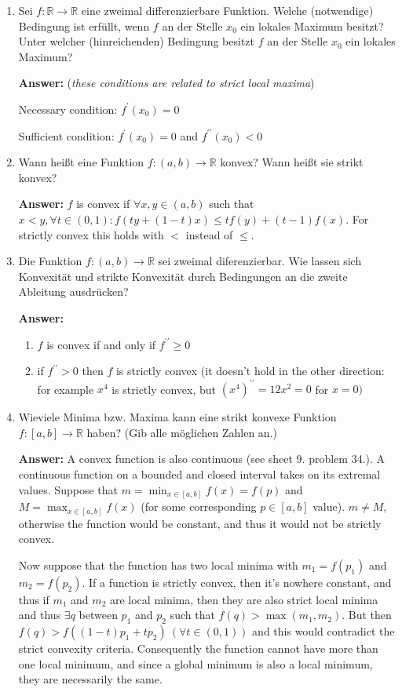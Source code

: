 \documentclass[11pt]{article}
\newcommand{\RR}[0]{\mathbb{R}}
\begin{document}
\begin{enumerate}
    \item Sei $f\colon \RR\to\RR$ eine zweimal differenzierbare Funktion. Welche (notwendige) Bedingung ist erfüllt, wenn $f$ an der Stelle $x_0$ ein lokales Maximum besitzt? Unter welcher (hinreichenden) Bedingung besitzt $f$ an der Stelle $x_0$ ein lokales Maximum?
    
    \textbf{Answer:} (\textit{these conditions are related to strict local maxima})

    Necessary condition: $f^\prime(x_0) = 0$

    Sufficient condition: $f^\prime(x_0) = 0$ and $f^{\prime\prime}(x_0) < 0$

    \item Wann heißt eine Funktion $f\colon (a, b)\to\RR$ konvex? Wann heißt sie strikt konvex?
    
    \textbf{Answer:} $f$ is convex if $\forall x, y \in (a, b)$ such that $x < y, \forall t \in (0, 1)\colon f(t y + (1-t) x) \le tf(y) + (t-1)f(x)$. For strictly convex this holds with $<$ instead of $\le$.
    \item Die Funktion $f\colon (a, b)\to\RR$ sei zweimal diferenzierbar. Wie lassen sich Konvexität
    und strikte Konvexität durch Bedingungen an die zweite Ableitung ausdrücken?

    \textbf{Answer:} 
    \begin{enumerate}
        \item $f$ is convex if and only if $f^{\prime\prime} \ge 0$
        \item if $f^{\prime\prime} > 0$ then $f$ is strictly convex (it doesn't hold in the other direction: for example $x^4$ is strictly convex, but $(x^4)^{\prime\prime} = 12x^2 = 0$ for $x=0)$
    \end{enumerate}

    \item Wieviele Minima bzw. Maxima kann eine strikt konvexe Funktion $f\colon [a,b]\to\RR$ haben? (Gib alle möglichen Zahlen an.)
    
    \textbf{Answer:} A convex function is also continuous (see sheet 9. problem 34.). A continuous function on a bounded and closed interval takes on its extremal values. Suppose that $m = \min_{x\in[a,b]} f(x) = f(p)$ and $M = \max_{x\in[a,b]} f(x)$ (for some corresponding $p \in [a, b]$ value). $m \neq M$, otherwise the function would be constant, and thus it would not be strictly convex.

    Now suppose that the function has two local minima with $m_1 = f(p_1)$ and $m_2 = f(p_2)$. If a function is strictly convex, then it's nowhere constant, and thus if $m_1$ and $m_2$ are local minima, then they are also strict local minima and thus $\exists q$ between $p_1$ and $p_2$ such that $f(q) > \max(m_1, m_2)$. But then $f(q) > f((1-t)p_1 + t p_2)~(\forall t\in(0, 1))$ and this would contradict the strict convexity criteria. Consequently the function cannot have more than one local minimum, and since a global minimum is also a local minimum, they are necessarily the same.


\end{enumerate}
\end{document}
